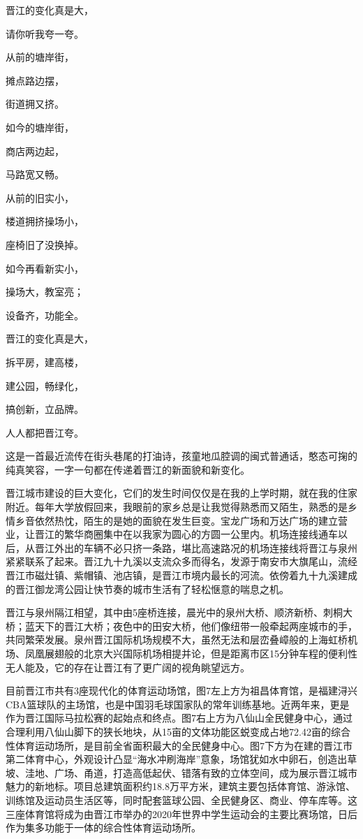 \documentclass[]{book}
\begin{document}
晋江的变化真是大，

请你听我夸一夸。

从前的塘岸街，

摊点路边摆，

街道拥又挤。

如今的塘岸街，

商店两边起，

马路宽又畅。

从前的旧实小，

楼道拥挤操场小，

座椅旧了没换掉。

如今再看新实小，

操场大，教室亮；

设备齐，功能全。

晋江的变化真是大，

拆平房，建高楼，

建公园，畅绿化，

搞创新，立品牌。

人人都把晋江夸。

这是一首最近流传在街头巷尾的打油诗，孩童地瓜腔调的闽式普通话，憨态可掬的纯真笑容，一字一句都在传递着晋江的新面貌和新变化。

晋江城市建设的巨大变化，它们的发生时间仅仅是在我的上学时期，就在我的住家附近。每年大学放假回来，我眼前的家乡总是让我觉得熟悉而又陌生，熟悉的是乡情乡音依然热忱，陌生的是她的面貌在发生巨变。宝龙广场和万达广场的建立营业，让晋江的繁华商圈集中在以我家为圆心的方圆一公里内。机场连接线通车以后，从晋江外出的车辆不必只挤一条路，堪比高速路况的机场连接线将晋江与泉州紧紧联系了起来。晋江九十九溪以支流众多而得名，发源于南安市大旗尾山，流经晋江市磁灶镇、紫帽镇、池店镇，是晋江市境内最长的河流。依傍着九十九溪建成的晋江御龙湾公园让快节奏的城市生活有了轻松惬意的喘息之机。

晋江与泉州隔江相望，其中由5座桥连接，晨光中的泉州大桥、顺济新桥、刺桐大桥；蓝天下的晋江大桥；夜色中的田安大桥，他们像纽带一般牵起两座城市的手，共同繁荣发展。泉州晋江国际机场规模不大，虽然无法和层峦叠嶂般的上海虹桥机场、凤凰展翅般的北京大兴国际机场相提并论，但是距离市区15分钟车程的便利性无人能及，它的存在让晋江有了更广阔的视角眺望远方。

目前晋江市共有3座现代化的体育运动场馆，图7左上方为祖昌体育馆，是福建浔兴CBA篮球队的主场馆，也是中国羽毛球国家队的常年训练基地。近两年来，更是作为晋江国际马拉松赛的起始点和终点。图7右上方为八仙山全民健身中心，通过合理利用八仙山脚下的狭长地块，从15亩的文体功能区蜕变成占地72.42亩的综合性体育运动场所，是目前全省面积最大的全民健身中心。图7下方为在建的晋江市第二体育中心，外观设计凸显``海水冲刷海岸''意象，场馆犹如水中卵石，创造出草坡、洼地、广场、甬道，打造高低起伏、错落有致的立体空间，成为展示晋江城市魅力的新地标。项目总建筑面积约18.8万平方米，建筑主要包括体育馆、游泳馆、训练馆及运动员生活区等，同时配套篮球公园、全民健身区、商业、停车库等。这三座体育馆将成为由晋江市举办的2020年世界中学生运动会的主要比赛场馆，日后作为集多功能于一体的综合性体育运动场所。
\end{document}
